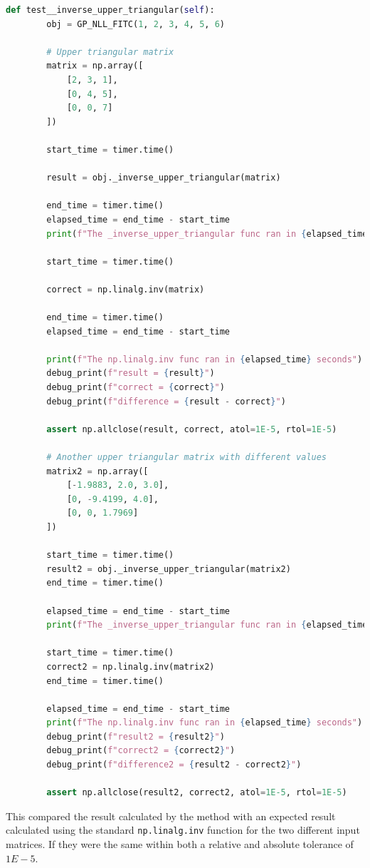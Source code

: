 \begin{lstlisting}[language=Python]
    def test__inverse_upper_triangular(self):
        obj = GP_NLL_FITC(1, 2, 3, 4, 5, 6)

        # Upper triangular matrix
        matrix = np.array([
            [2, 3, 1],
            [0, 4, 5],
            [0, 0, 7]
        ])

        start_time = timer.time()

        result = obj._inverse_upper_triangular(matrix)

        end_time = timer.time()
        elapsed_time = end_time - start_time
        print(f"The _inverse_upper_triangular func ran in {elapsed_time} seconds")

        start_time = timer.time()

        correct = np.linalg.inv(matrix)

        end_time = timer.time()
        elapsed_time = end_time - start_time

        print(f"The np.linalg.inv func ran in {elapsed_time} seconds")
        debug_print(f"result = {result}")
        debug_print(f"correct = {correct}")
        debug_print(f"difference = {result - correct}")

        assert np.allclose(result, correct, atol=1E-5, rtol=1E-5)

        # Another upper triangular matrix with different values
        matrix2 = np.array([
            [-1.9883, 2.0, 3.0],
            [0, -9.4199, 4.0],
            [0, 0, 1.7969]
        ])

        start_time = timer.time()
        result2 = obj._inverse_upper_triangular(matrix2)
        end_time = timer.time()

        elapsed_time = end_time - start_time
        print(f"The _inverse_upper_triangular func ran in {elapsed_time} seconds")

        start_time = timer.time()
        correct2 = np.linalg.inv(matrix2)
        end_time = timer.time()

        elapsed_time = end_time - start_time
        print(f"The np.linalg.inv func ran in {elapsed_time} seconds")
        debug_print(f"result2 = {result2}")
        debug_print(f"correct2 = {correct2}")
        debug_print(f"difference2 = {result2 - correct2}")

        assert np.allclose(result2, correct2, atol=1E-5, rtol=1E-5)
\end{lstlisting}


This compared the result calculated by the method with an expected result calculated using the standard \texttt{np.linalg.inv} function for the two different input matrices.
If they were the same within both a relative and absolute tolerance of $1E-5.$

